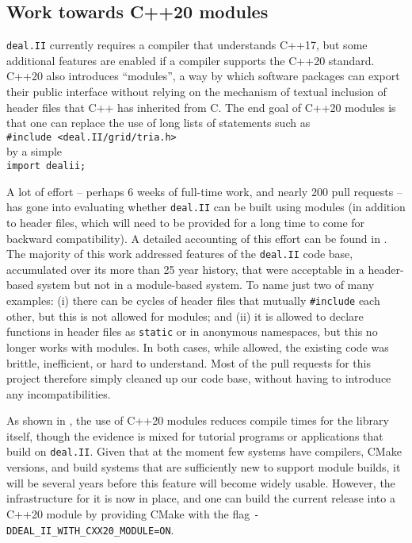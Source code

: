 \documentclass{ansarticle-preprint}
\newcommand{\specialword}[1]{\texttt{#1}}
\newcommand{\dealii}{{\specialword{deal.II}}\xspace}
\begin{document}
\subsection{Work towards C++20 modules}
\label{subsec:modules}

\dealii{} currently requires a compiler that understands C++17, but
some additional features are enabled if a compiler supports the C++20
standard. C++20 also introduces ``modules'', a way by which software
packages can export their public interface without relying on the
mechanism of textual inclusion of header files that C++ has inherited from C. The
end goal of C++20 modules is that one can replace the use of long
lists of statements such as\\
\hspace*{1cm}\texttt{\#include <deal.II/grid/tria.h>}\\
by a simple\\
\hspace*{1cm}\texttt{import dealii;}

A lot of effort -- perhaps 6 weeks of full-time work, and nearly 200
pull requests -- has gone into evaluating whether \dealii{} can be
built using modules (in addition to header files, which will need to
be provided for a long time to come for backward compatibility). A
detailed accounting of this effort can be found in
\cite{bangerth2025experienceconvertinglargemathematical}. The majority
of this work addressed features of the \dealii{} code base,
accumulated over its more than 25 year history, that were acceptable
in a header-based system but not in a module-based system. To name
just two of many examples: (i) there can be cycles of header files that mutually
\texttt{\#include} each other, but this is not allowed for
modules; and (ii) it is allowed to declare functions in header files
as \texttt{static} or in anonymous namespaces, but this no longer
works with modules. In both cases, while allowed, the existing code
was brittle, inefficient, or hard to understand. Most of the pull requests for this project therefore simply
cleaned up our code base, without having to introduce any
incompatibilities.

As shown in \cite{bangerth2025experienceconvertinglargemathematical},
the use of C++20 modules
reduces compile times for the library itself, though the evidence is
mixed for tutorial programs or applications that build on
\dealii{}. Given that at the moment few systems have compilers, CMake
versions, and build systems that are sufficiently new to support
module builds, it will be several years before this feature will
become widely usable. However, the infrastructure for it is now
in place, and one can build the current release into a C++20 module by
providing CMake with the flag \texttt{-DDEAL\_II\_WITH\_CXX20\_MODULE=ON}.
\end{document}
